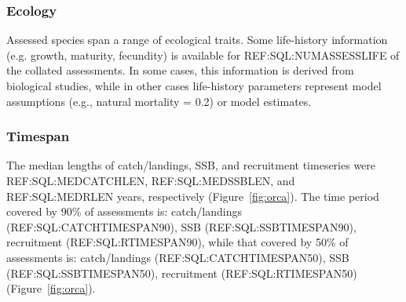 

\subsubsection*{Ecology}
Assessed species span a range of ecological traits. Some life-history
information (e.g. growth, maturity, fecundity) is available for
REF:SQL:NUMASSESSLIFE of the collated assessments. In some cases, this
information is derived from biological studies, while in other cases
life-history parameters represent model assumptions (e.g., natural
mortality = 0.2) or model estimates. 





\subsubsection*{Timespan }


The median lengths of catch/landings, SSB, and recruitment timeseries
were REF:SQL:MEDCATCHLEN, REF:SQL:MEDSSBLEN, and REF:SQL:MEDRLEN
years, respectively (Figure~\ref{fig:orca}).  The time period covered by 90\% of assessments
is: catch/landings (REF:SQL:CATCHTIMESPAN90), SSB
(REF:SQL:SSBTIMESPAN90), recruitment (REF:SQL:RTIMESPAN90), while that
covered by 50\% of assessments is: catch/landings
(REF:SQL:CATCHTIMESPAN50), SSB (REF:SQL:SSBTIMESPAN50), recruitment
(REF:SQL:RTIMESPAN50) (Figure~\ref{fig:orca}).


